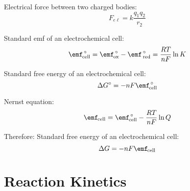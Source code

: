 \documentclass[10pt]{article}
\begin{document}
Electrical force between two charged bodies:
\begin{equation*}
F_{e\ell}=k\frac{q_1q_2}{r_2}
\end{equation*}

Standard emf of an electrochemical cell:
\begin{equation*}
\textnormal{\Enotcell} = \textnormal{$\emf^{\hspace*{.5mm}\circ}_{\hspace*{-.3mm}\textnormal{ox}}$} - \textnormal{$\emf^{\hspace*{.5mm}\circ}_{\hspace*{.5mm}\textnormal{red}}$}  = \frac{RT}{nF} \ln K
\end{equation*}

Standard free energy of an electrochemical cell:
\begin{equation*}
\Delta G\not = -nF\textnormal{\Enotcell}
\end{equation*}

Nernst equation:
\begin{equation*}
\textnormal{\Ecell} = \textnormal{\Enotcell} - \frac{RT}{nF}\ln Q
\end{equation*}

Therefore:
Standard free energy of an electrochemical cell:
\begin{equation*}
\Delta G = -nF\textnormal{\Ecell}
\end{equation*}

\section{Reaction Kinetics}
\end{document}
